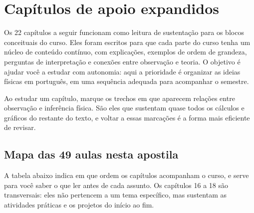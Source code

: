 \documentclass[11pt,a4paper]{article}
\begin{document}
\newpage

\section*{Capítulos de apoio expandidos}
Os 22 capítulos a seguir funcionam como leitura de sustentação para os blocos conceituais do curso. Eles foram escritos para que cada parte do curso tenha um núcleo de conteúdo contínuo, com explicações, exemplos de ordem de grandeza, perguntas de interpretação e conexões entre observação e teoria. O objetivo é ajudar você a estudar com autonomia: aqui a prioridade é organizar as ideias físicas em português, em uma sequência adequada para acompanhar o semestre.

\begin{noticebox}
Ao estudar um capítulo, marque os trechos em que aparecem relações entre observação e inferência física. São eles que sustentam quase todos os cálculos e gráficos do restante do texto, e voltar a essas marcações é a forma mais eficiente de revisar.
\end{noticebox}

\subsection*{Mapa das 49 aulas nesta apostila}

A tabela abaixo indica em que ordem os capítulos acompanham o curso, e serve para você saber o que ler antes de cada assunto. Os capítulos 16 a 18 são transversais: eles não pertencem a um tema específico, mas sustentam as atividades práticas e os projetos do início ao fim.
\end{document}
